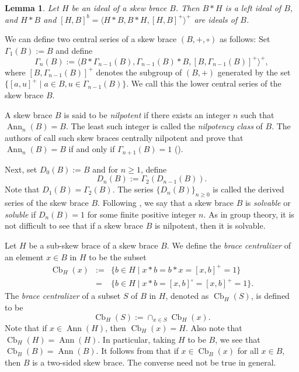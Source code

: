 \documentclass[11pt, oneside]{amsart}
\numberwithin{equation}{section}
\theoremstyle{plain}
\newtheorem{lemma}[equation]{Lemma}
\theoremstyle{definition}
\newcommand{\Cb}{\operatorname{Cb} }
\newcommand{\Ann}{\operatorname{Ann} }
\begin{document}
 \begin{lemma}
 Let $H$ be an ideal  of a skew brace $B$.  Then $B*H$ is a left ideal of $B$, and  $H*B$ and $[H, B]^b = \langle H*B, B*H, [H, B]^+\rangle^+$ are  ideals of $B$.
 \end{lemma}

 We can define two central series of a skew brace $(B, +, \circ)$ as follows:  Set $\Gamma_1(B)  := B$ and define
$$\Gamma_n(B) := \langle B * \Gamma_{n-1}(B), \Gamma_{n-1}(B) * B, [B, \Gamma_{n-1}(B)]^{+}\rangle^{+},$$
where $[B, \Gamma_{n-1}(B)]^{+}$ denotes the subgroup of $(B, +)$ generated by the set $\{[a, u]^{+} \mid a \in B, u \in \Gamma_{n-1}(B)\}$. We call this the lower central series of the skew brace $B$.

A skew brace $B$ is said to be  {\em nilpotent} if there exists an integer $n$ such that  $\Ann_n(B) = B$. The least such integer is called the  {\em nilpotency class} of $B$.  The authors of \cite{BJ23} call such skew braces centrally nilpotent and prove that   $\Ann_n(B) = B$ if and only if $\Gamma_{n+1}(B) = 1$ (\cite[Theorem 2.8]{BJ23}). 
 
Next, set $D_0(B) := B$ and for $n \geqslant 1$, define 
$$D_n(B):= \Gamma_2(D_{n-1}(B)).$$
Note that $D_1(B) = \Gamma_2(B)$. The series $\{D_n(B)\}_{n\geqslant 0}$ is called the derived series of the skew brace $B$. Following \cite{BEJP24}, we say that a skew brace $B$ is {\em solvable} or {\em soluble} if $D_n(B) = 1$ for some finite positive integer $n$. As in group theory, it is not difficult to see that if a skew brace $B$ is nilpotent, then it is solvable. 

Let $H$ be a sub-skew brace of a skew brace $B$. We define the  \emph{brace centralizer} of an element $x \in B$ in $H$ to be the subset 
\begin{eqnarray*}
\Cb_H(x) &:=&  \{b \in H \mid x * b = b * x = [x, b]^{+} = 1\}\\
&= &\{b \in H \mid x * b = [x, b]^{\circ} = [x, b]^{+} = 1\}.
\end{eqnarray*}
The {\it brace centralizer}  of a subset  $S$ of $B$ in $H$, denoted as $\Cb_{H}(S)$, is defined to be
$$\Cb_{H}(S) := \cap_{x \in S} \Cb_H(x).$$
 Note that if $x \in \Ann(H)$, then $\Cb_{H}(x) = H$. Also note that $\Cb_{H}(H) = \Ann(H)$. In particular, taking $H$ to be $B$, we see that $\Cb_{B}(B) = \Ann(B)$. It follows from \cite[Proposition 2.19]{SV18} that if $x \in \Cb_{B}(x)$ for all $x \in B$, then $B$ is a two-sided skew brace. The converse need not be true in general. 
\end{document}
